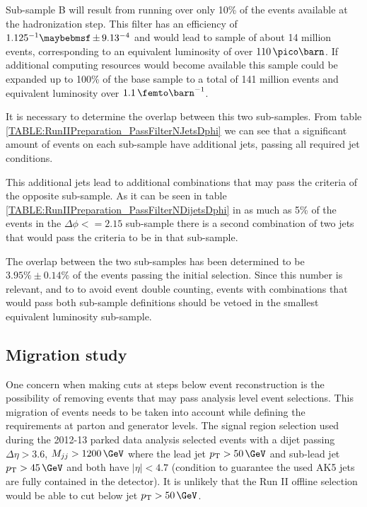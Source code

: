 Sub-sample B will result from running over only 10\% of the events available at the hadronization step. This filter has an efficiency of $1.125 \time 10^{-1} \pm 9.13 \time 10^{-4}$  and would lead to sample of about 14 million events, corresponding to an equivalent luminosity of over $110\,\pico\barn$. If additional computing resources would become available this sample could be expanded up to 100\% of the base sample to a total of 141 million events and equivalent luminosity over $1.1\,\femto\barn^{-1}$.

It is necessary to determine the overlap between this two sub-samples. From table \ref{TABLE:RunIIPreparation_PassFilterNJetsDphi} we can see that a significant amount of events on each sub-sample have additional jets, passing all required jet conditions. 



This additional jets lead to additional combinations that may pass the criteria of the opposite sub-sample. As it can be seen in table \ref{TABLE:RunIIPreparation_PassFilterNDijetsDphi} in as much as 5\% of the events in the $\Delta\phi<=2.15$ sub-sample there is a second combination of two jets that would pass the criteria to be in that sub-sample.



The overlap between the two sub-samples has been determined to be $3.95\% \pm 0.14\%$ of the events passing the initial selection. Since this number is relevant, and to to avoid event double counting, events with combinations that would pass both sub-sample definitions should be vetoed in the smallest equivalent luminosity sub-sample.

\subsection{Migration study}
\label{SUBSECTION:RunIIPreparation_MigrationStudy}


One concern when making cuts at steps below event reconstruction is the possibility of removing events that may pass analysis level event selections. This migration of events needs to be taken into account while defining the requirements at parton and generator levels. The signal region selection used during the 2012-13 parked data analysis selected events with a dijet passing $\Delta\eta>3.6$, $M_{jj}>1200\,\GeV$ where the lead jet $\pt > 50\,\GeV$ and sub-lead jet $\pt > 45\,\GeV$ and both have $|\eta|<4.7$ (condition to guarantee the used AK5 jets are fully contained in the detector). It is unlikely that the Run II offline selection would be able to cut below jet $\pt > 50\,\GeV$.

